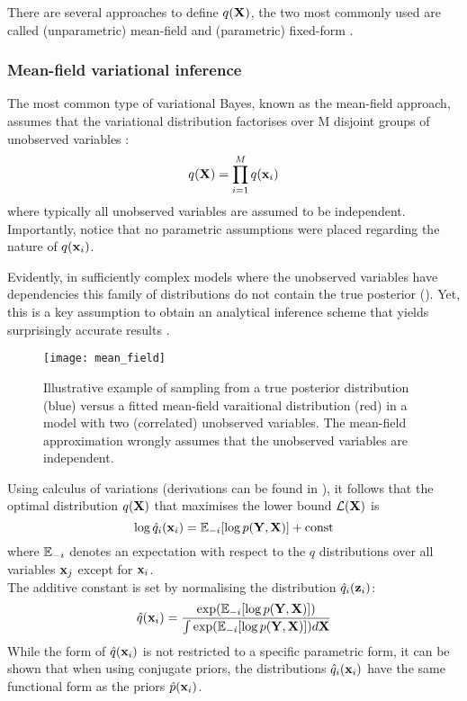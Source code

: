 There are several approaches to define $q({\bf X})$, the two most commonly used are called (unparametric) mean-field and (parametric) fixed-form \cite{Zhang2017,Blei2016}.

\subsubsection{Mean-field variational inference}  \label{section:mean_field}

The most common type of variational Bayes, known as the mean-field approach, assumes that the variational distribution factorises over M disjoint groups of unobserved variables \cite{Saul1996}:
\begin{equation} \label{eq:mean_field}
	q({\bf X}) = \prod_{i=1}^{M} q({\bf x}_i)
\end{equation}
where typically all unobserved variables are assumed to be independent. Importantly, notice that no parametric assumptions were placed regarding the nature of $q({\bf x}_i)$.

Evidently, in sufficiently complex models where the unobserved variables have dependencies this family of distributions do not contain the true posterior (). Yet, this is a key assumption to obtain an analytical inference scheme that yields surprisingly accurate results \cite{Blei2006,Faes2011,Braun2007}.

\begin{figure}[H]
	\centering
	\texttt{[image: mean\_field]}
	\caption{Illustrative example of sampling from a true posterior distribution (blue) versus a fitted mean-field varaitional distribution (red) in a model with two (correlated) unobserved variables. The mean-field approximation wrongly assumes that the unobserved variables are independent.}
	\label{fig:mean_field}
\end{figure}

Using calculus of variations (derivations can be found in \cite{Bishop2006,Murphy}), it follows that the optimal distribution $q({\bf X})$ that maximises the lower bound $\mathcal{L}({\bf X})$ is
\begin{equation} \label{eq:optimal}
	\log \hat{q}_i({\bf x}_i) = \mathbb{E}_{-i} [\log p({\bf Y},{\bf X})] + \mathrm{const}
\end{equation}
where $\mathbb{E}_{-i}$ denotes an expectation with respect to the $q$ distributions over all variables ${\bf x}_j$ except for ${\bf x}_i$.\\
The additive constant is set by normalising the distribution $\hat{q}_i({\bf z}_i)$:
\[
	\hat{q}({\bf x}_i) = \frac{\exp(\mathbb{E}_{-i}[\log p({\bf Y},{\bf X})])}{\int \exp(\mathbb{E}_{-i}[\log p({\bf Y},{\bf X})]) d{\bf X}}
\]
While the form of $\hat{q}({\bf x}_i)$ is not restricted to a specific parametric form, it can be shown that when using conjugate priors, the distributions $\hat{q}_i({\bf x}_i)$ have the same functional form as the priors $\hat{p}({\bf x}_i)$. 


